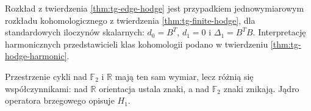 \begin{uwaga}
Rozkład z twierdzenia \ref{thm:tg-edge-hodge} jest przypadkiem
jednowymiarowym rozkładu kohomologicznego z twierdzenia
\ref{thm:tg-finite-hodge}, dla standardowych iloczynów skalarnych:
$d_0=B^T$, $d_1=0$ i $\Delta_1=B^TB$.
Interpretację harmonicznych przedstawicieli klas kohomologii
podano w twierdzeniu \ref{thm:tg-hodge-harmonic}.
\end{uwaga}

Przestrzenie cykli nad $\mathbb F_2$ i $\mathbb R$
mają ten sam wymiar, lecz różnią się współczynnikami:
nad $\mathbb R$ orientacja ustala znaki, a nad $\mathbb F_2$
znaki znikają. Jądro operatora brzegowego opisuje $H_1$.


